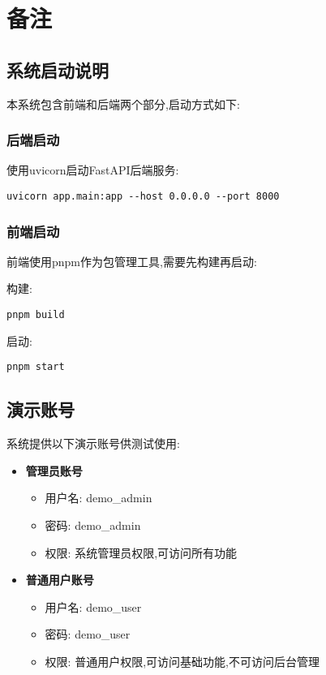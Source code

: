 \section{备注}

\subsection{系统启动说明}

本系统包含前端和后端两个部分,启动方式如下:

\subsubsection{后端启动}
使用uvicorn启动FastAPI后端服务:
\begin{verbatim}
uvicorn app.main:app --host 0.0.0.0 --port 8000
\end{verbatim}

\subsubsection{前端启动}
前端使用pnpm作为包管理工具,需要先构建再启动:

构建:
\begin{verbatim}
pnpm build
\end{verbatim}

启动:
\begin{verbatim}
pnpm start
\end{verbatim}

\subsection{演示账号}

系统提供以下演示账号供测试使用:

\begin{itemize}
    \item \textbf{管理员账号}
    \begin{itemize}
        \item 用户名: demo\_admin
        \item 密码: demo\_admin
        \item 权限: 系统管理员权限,可访问所有功能
    \end{itemize}
    
    \item \textbf{普通用户账号}
    \begin{itemize}
        \item 用户名: demo\_user  
        \item 密码: demo\_user
        \item 权限: 普通用户权限,可访问基础功能,不可访问后台管理
    \end{itemize}
\end{itemize}


